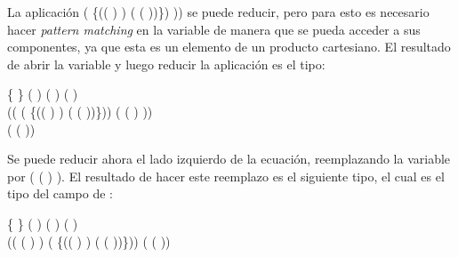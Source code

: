 La aplicación (\AgdaSymbol{$\lambda$} \{(( \AgdaInductiveConstructor{,} ) \AgdaInductiveConstructor{,} ) \AgdaSymbol{$\rightarrow$} ( \AgdaInductiveConstructor{,} ( \AgdaInductiveConstructor{,} ))\}) )) se puede reducir, pero para esto es necesario hacer \textit{pattern matching} en la variable  de manera que se pueda acceder a sus componentes, ya que esta es un elemento de un producto cartesiano. El resultado de abrir la variable  y luego reducir la aplicación es el tipo:
\begin{center}
\AgdaSymbol{$\forall$} \{ \AgdaSymbol{:} \} \AgdaSymbol{$\rightarrow$} ( \AgdaSymbol{:} ) ( \AgdaSymbol{:} ) ( \AgdaSymbol{:} ) \AgdaSymbol{$\rightarrow$} \\ ((\AgdaSymbol{$\lambda$}  \AgdaSymbol{$\rightarrow$}  \AgdaField{$\gg=$} (\AgdaSymbol{$\lambda$} \{(( \AgdaInductiveConstructor{,} ) \AgdaInductiveConstructor{,} ) \AgdaSymbol{$\rightarrow$}  ( \AgdaInductiveConstructor{,} ( \AgdaInductiveConstructor{,} ))\})) ( ( ) )) \\  (  ( ))
\end{center}

Se puede reducir ahora el lado izquierdo de la ecuación, reemplazando la variable  por ( ( ) ). El resultado de hacer este reemplazo es el siguiente tipo, el cual es el tipo del campo  de :
\begin{center}
\AgdaSymbol{$\forall$} \{ \AgdaSymbol{:} \} \AgdaSymbol{$\rightarrow$} ( \AgdaSymbol{:} ) ( \AgdaSymbol{:} ) ( \AgdaSymbol{:} ) \AgdaSymbol{$\rightarrow$} \\ (( ( ) ) \AgdaField{$\gg=$} (\AgdaSymbol{$\lambda$} \{(( \AgdaInductiveConstructor{,} ) \AgdaInductiveConstructor{,} ) \AgdaSymbol{$\rightarrow$}  ( \AgdaInductiveConstructor{,} ( \AgdaInductiveConstructor{,} ))\}))  (  ( ))
\end{center}

